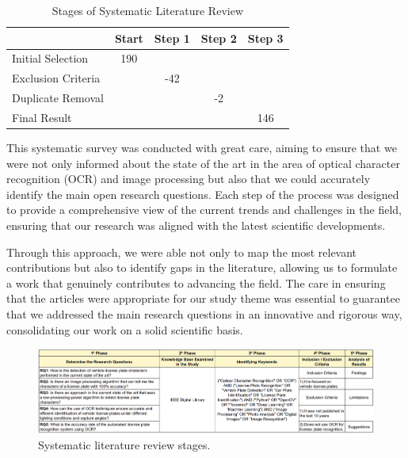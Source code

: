 \documentclass[conference]{IEEEtran}
\begin{document}
	\begin{table}[H]
		\caption{Stages of Systematic Literature Review}
		\begin{center}
			\begin{tabular}{l|c|c|c|c|}
				\cline{2-5}
				& Start & Step 1 & Step 2 & Step 3 \\ \hline
				\multicolumn{1}{|l|}{Initial Selection}       & 190    &         &         &         \\ \hline
				\multicolumn{1}{|l|}{Exclusion Criteria} &        & -42     &         &         \\ \hline
				\multicolumn{1}{|l|}{Duplicate Removal} &        &         & -2      &         \\ \hline
				\multicolumn{1}{|l|}{Final Result}       &        &         &         & 146     \\ \hline
			\end{tabular}
			\label{tab1}
		\end{center}
	\end{table}
	
	This systematic survey was conducted with great care, aiming to ensure that we were not only informed about the state of the art in the area of optical character recognition (OCR) and image processing but also that we could accurately identify the main open research questions. Each step of the process was designed to provide a comprehensive view of the current trends and challenges in the field, ensuring that our research was aligned with the latest scientific developments.
	
	Through this approach, we were able not only to map the most relevant contributions but also to identify gaps in the literature, allowing us to formulate a work that genuinely contributes to advancing the field. The care in ensuring that the articles were appropriate for our study theme was essential to guarantee that we addressed the main research questions in an innovative and rigorous way, consolidating our work on a solid scientific basis.
	
	\begin{figure}[htbp]
		\centerline{\includegraphics[width=\textwidth]{img1-en.png}}
		\caption{Systematic literature review stages.}
		\label{img1}
	\end{figure}
	
\end{document}
